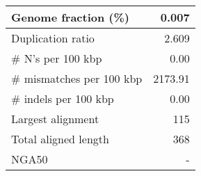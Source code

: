 \documentclass[12pt,a4paper]{article}
\begin{document}
\begin{table}[ht]
\begin{center}
\begin{tabular}{|l*{1}{|r}|}
Genome fraction (\%) & 0.007 \\ \hline
Duplication ratio & 2.609 \\ \hline
\# N's per 100 kbp & 0.00 \\ \hline
\# mismatches per 100 kbp & 2173.91 \\ \hline
\# indels per 100 kbp & 0.00 \\ \hline
Largest alignment & 115 \\ \hline
Total aligned length & 368 \\ \hline
NGA50 & - \\ \hline
\end{tabular}
\end{center}
\end{table}
\end{document}
